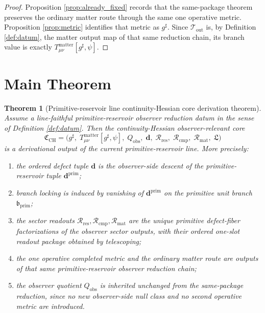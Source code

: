 \documentclass[11pt]{article}
\newcommand{\CompletedMetric}{g^{\sharp}}
\newcommand{\ObserverQuotient}{Q_{\mathrm{obs}}}
\newcommand{\DefectTuple}{\mathbf d}
\newcommand{\PrimDefectTuple}{\mathbf d^{\mathrm{prim}}}
\newcommand{\ResidualRead}{\mathscr R_{\mathrm{res}}}
\newcommand{\CompletionRead}{\mathscr R_{\mathrm{cmp}}}
\newcommand{\MatterRead}{\mathscr R_{\mathrm{mat}}}
\newcommand{\BranchLock}{\mathfrak L}
\newcommand{\CoreData}{\mathfrak C_{\mathrm{CH}}}
\newcommand{\PrimBranch}{\mathfrak b_{\mathrm{prim}}}
\newcommand{\MatterOut}{\mathscr T_{\mathrm{out}}}
\newtheorem{theorem}{Theorem}
\begin{document}
\begin{proof}
Proposition \ref{prop:already_fixed} records that the same-package theorem preserves the ordinary matter route through the same one operative metric. Proposition \ref{prop:metric} identifies that metric as \(\CompletedMetric\). Since \(\MatterOut\) is, by Definition \ref{def:datum}, the matter output map of that same reduction chain, its branch value is exactly \(T_{\mu\nu}^{\mathrm{matter}}[\CompletedMetric,\psi]\).
\end{proof}

\section{Main Theorem}

\begin{theorem}[Primitive-reservoir line continuity-Hessian core derivation theorem]
\label{thm:main}
Assume a line-faithful primitive-reservoir observer reduction datum in the sense of Definition \ref{def:datum}. Then the continuity-Hessian observer-relevant core
\[
\CoreData
=
\bigl(
\CompletedMetric,\;
T_{\mu\nu}^{\mathrm{matter}}[\CompletedMetric,\psi],\;
\ObserverQuotient,\;
\DefectTuple,\;
\ResidualRead,\;
\CompletionRead,\;
\MatterRead,\;
\BranchLock
\bigr)
\]
is a derivational output of the current primitive-reservoir line. More precisely:
\begin{enumerate}
    \item the ordered defect tuple \(\DefectTuple\) is the observer-side descent of the primitive-reservoir tuple \(\PrimDefectTuple\);
    \item branch locking is induced by vanishing of \(\PrimDefectTuple\) on the primitive unit branch \(\PrimBranch\);
    \item the sector readouts \(\ResidualRead,\CompletionRead,\MatterRead\) are the unique primitive defect-fiber factorizations of the observer sector outputs, with their ordered one-slot readout package obtained by telescoping;
    \item the one operative completed metric and the ordinary matter route are outputs of that same primitive-reservoir observer reduction chain;
    \item the observer quotient \(\ObserverQuotient\) is inherited unchanged from the same-package reduction, since no new observer-side null class and no second operative metric are introduced.
\end{enumerate}
\end{theorem}
\end{document}
